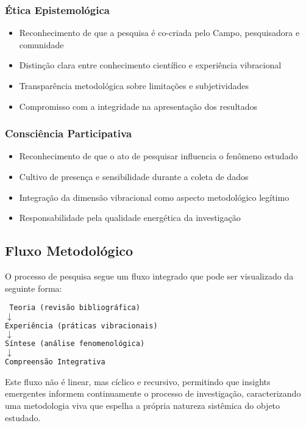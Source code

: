 \subsubsection{Ética Epistemológica}
\begin{itemize}
    \item Reconhecimento de que a pesquisa é co-criada pelo Campo, pesquisadora e comunidade
    \item Distinção clara entre conhecimento científico e experiência vibracional
    \item Transparência metodológica sobre limitações e subjetividades
    \item Compromisso com a integridade na apresentação dos resultados
\end{itemize}

\subsubsection{Consciência Participativa}
\begin{itemize}
    \item Reconhecimento de que o ato de pesquisar influencia o fenômeno estudado
    \item Cultivo de presença e sensibilidade durante a coleta de dados
    \item Integração da dimensão vibracional como aspecto metodológico legítimo
    \item Responsabilidade pela qualidade energética da investigação
\end{itemize}

\subsection{Fluxo Metodológico}

O processo de pesquisa segue um fluxo integrado que pode ser visualizado da seguinte forma:

\begin{center}
\texttt{
Teoria (revisão bibliográfica) \\
$\downarrow$ \\
Experiência (práticas vibracionais) \\
$\downarrow$ \\
Síntese (análise fenomenológica) \\
$\downarrow$ \\
Compreensão Integrativa
}
\end{center}

Este fluxo não é linear, mas cíclico e recursivo, permitindo que insights emergentes informem continuamente o processo de investigação, caracterizando uma metodologia viva que espelha a própria natureza sistêmica do objeto estudado.

\newpage